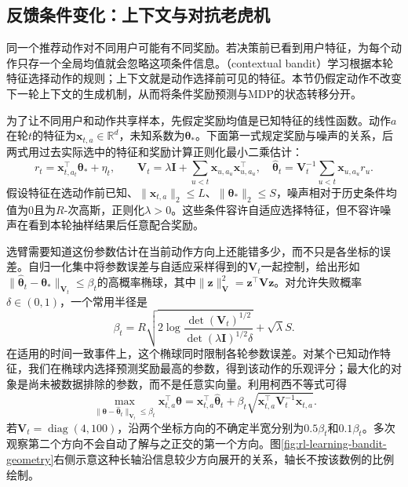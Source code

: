 \subsection{反馈条件变化：上下文与对抗老虎机}
\label{sec:rl-learning-contextual}

同一个推荐动作对不同用户可能有不同奖励。若决策前已看到用户特征，为每个动作只存一个全局均值就会忽略这项条件信息。（contextual bandit）学习根据本轮特征选择动作的规则；上下文就是动作选择前可见的特征。本节仍假定动作不改变下一轮上下文的生成机制，从而将条件奖励预测与MDP的状态转移分开。

为了让不同用户和动作共享样本，先假定奖励均值是已知特征的线性函数。动作$a$在轮$t$的特征为$\bm{x}_{t,a}\in\mathbb R^d$，未知系数为$\bm\theta_*$。下面第一式规定奖励与噪声的关系，后两式用过去实际选中的特征和奖励计算正则化最小二乘估计：
\begin{equation}
  r_t=\bm{x}_{t,a_t}^{\top}\bm{\theta}_*+\eta_t,\qquad
  \bm{V}_t=\lambda\bm{I}+\sum_{u<t}\bm{x}_{u,a_u}\bm{x}_{u,a_u}^{\top},
  \quad
  \widehat{\bm{\theta}}_t
  =\bm{V}_t^{-1}\sum_{u<t}\bm{x}_{u,a_u}r_u .
  \label{eq:rl-learning-linear-bandit}
\end{equation}
假设特征在选动作前已知、$\lVert\bm{x}_{t,a}\rVert_2\leq L$、$\lVert\bm{\theta}_*\rVert_2\leq S$，噪声相对于历史条件均值为0且为$R$-次高斯，正则化$\lambda>0$。这些条件容许自适应选择特征，但不容许噪声在看到本轮抽样结果后任意配合奖励。

选臂需要知道这份参数估计在当前动作方向上还能错多少，而不只是各坐标的误差。自归一化集中将参数误差与自适应采样得到的$\bm V_t$一起控制，给出形如$\lVert\widehat{\bm{\theta}}_t-\bm{\theta}_*\rVert_{\bm{V}_t}\leq\beta_t$的高概率椭球，其中$\lVert\bm{z}\rVert_{\bm{V}}^2=\bm{z}^{\top}\bm{V}\bm{z}$。对允许失败概率$\delta\in(0,1)$，一个常用半径是
\[
  \beta_t=R\sqrt{2\log
       \frac{\det(\bm{V}_t)^{1/2}}
            {\det(\lambda\bm{I})^{1/2}\delta}}
       +\sqrt{\lambda}S .
\]
在适用的时间一致事件上，这个椭球同时限制各轮参数误差。对某个已知动作特征，我们在椭球内选择预测奖励最高的参数，得到该动作的乐观评分；最大化的对象是尚未被数据排除的参数，而不是任意实向量。利用柯西不等式可得
\[
  \max_{\lVert\bm{\theta}-\widehat{\bm{\theta}}_t\rVert_{\bm{V}_t}\leq\beta_t}
  \bm{x}_{t,a}^{\top}\bm{\theta}
  =
  \bm{x}_{t,a}^{\top}\widehat{\bm{\theta}}_t
  +\beta_t\sqrt{\bm{x}_{t,a}^{\top}\bm{V}_t^{-1}\bm{x}_{t,a}}.
\]
若$\bm{V}_t=\operatorname{diag}(4,100)$，沿两个坐标方向的不确定半宽分别为$0.5\beta_t$和$0.1\beta_t$。多次观察第二个方向不会自动了解与之正交的第一个方向。图\ref{fig:rl-learning-bandit-geometry}右侧示意这种长轴沿信息较少方向展开的关系，轴长不按该数例的比例绘制。

